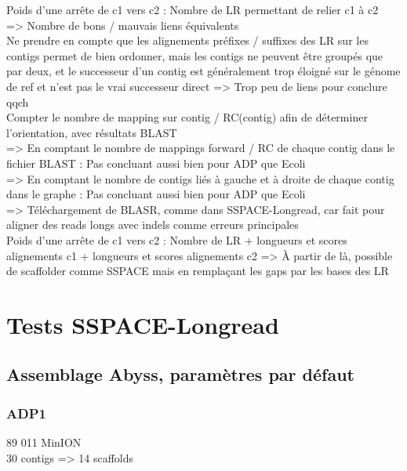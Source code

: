 \documentclass[12pt]{article}
\begin{document}
Poids d'une arrête de c1 vers c2 : Nombre de LR permettant de relier c1 à c2 \\

=> Nombre de bons / mauvais liens équivalents \\

Ne prendre en compte que les alignements préfixes / suffixes des LR sur les contigs permet de bien ordonner, mais les contigs ne peuvent être groupés que par deux, et le successeur d'un contig est généralement trop éloigné sur le génome de ref et n'est pas le vrai successeur direct => Trop peu de liens pour conclure qqch \\

Compter le nombre de mapping sur contig / RC(contig) afin de déterminer l'orientation, avec résultats BLAST \\
=> En comptant le nombre de mappings forward / RC de chaque contig dans le fichier BLAST : Pas concluant aussi bien pour ADP que Ecoli \\
=> En comptant le nombre de contigs liés à gauche et à droite de chaque contig dans le graphe : Pas concluant aussi bien pour ADP que Ecoli \\

=> Téléchargement de BLASR, comme dans SSPACE-Longread, car fait pour aligner des reads longs avec indels comme erreurs principales \\

Poids d'une arrête de c1 vers c2 : Nombre de LR + longueurs et scores alignements c1 + longueurs et scores alignements c2 => À partir de là,
possible de scaffolder comme SSPACE mais en remplaçant les gaps par les bases des LR \\

\section{Tests SSPACE-Longread}

\subsection{Assemblage Abyss, paramètres par défaut}

\subsubsection{ADP1}

89 011 MinION \\

30 contigs => 14 scaffolds \\
\end{document}
